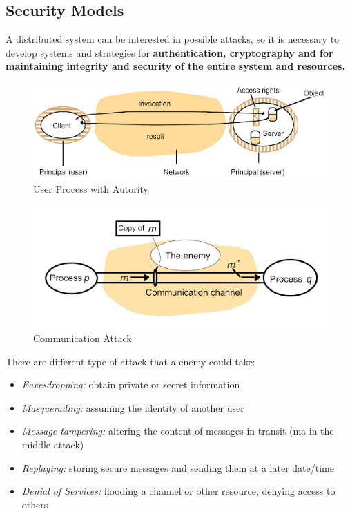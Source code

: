 \subsection{Security Models}
A distributed system can be interested in possible attacks, so it is necessary to develop systems and strategies for \textbf{authentication, cryptography and for maintaining integrity and security of the entire system and resources.}
\begin{figure}[!h]
            \centering
            \includegraphics[width=.7\linewidth]{images/modelOfSystems/UserProcessWithAutority.jpeg}
            \caption{User Process with Autority}
    \end{figure}
\begin{figure}[!h]
            \centering
            \includegraphics[width=.7\linewidth]{images/modelOfSystems/CommunicationAttack.jpeg}
            \caption{Communication Attack}
    \end{figure}
There are different type of attack that a enemy could take:
\begin{itemize}
    \item \textit{Eavesdropping:} obtain private or secret information
    \item \textit{Masquerading:} assuming the identity of another user
    \item \textit{Message tampering:} altering the content of messages in transit (ma in the middle attack)
    \item \textit{Replaying:} storing secure messages and sending them at a later date/time
    \item \textit{Denial of Services:} flooding a channel or other resource, denying access to others
\end{itemize}

